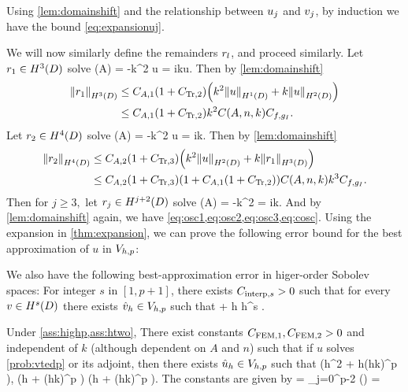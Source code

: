 Using \cref{lem:domainshift} and the relationship between $u_{j}$ and $v_{j}$, by induction we have the bound \cref{eq:expansionuj}.

We will now similarly define the remainders $r_{l}$, and proceed similarly.
Let $\ro \in \HthD$ solve
\beqs
\grad \cdot \mleft(A\grad \ro\mright) = -k^2 u
\eeqs
\beqs
\dn \ro = iku.
\eeqs
Then by \cref{lem:domainshift}
\begin{align*}
\NHthD{\ro} &\leq \CAo\mleft(1+\CTrt\mright)\mleft(k^2\NHoD{u} + k\NHtD{u}\mright)\\
&\leq \CAo\mleft(1+\CTrt\mright)k^2\CAnk\Cfg.
\end{align*}
Let $\rt \in \HfD$ solve
\beqs
\grad \cdot \mleft(A\grad \rt\mright) = -k^2 u
\eeqs
\beqs
\dn \rt = ik\ro.
\eeqs
Then by \cref{lem:domainshift}
\begin{align*}
\NHfD{\rt} &\leq \CAt\mleft(1+\CTrth\mright)\mleft(k^2\NHtD{u} + k\NHthD{\ro}\mright)\\
&\leq \CAt\mleft(1+\CTrth\mright)\mleft(1 + \CAo\mleft(1+\CTrt\mright)\mright)\CAnk k^3\Cfg.
\end{align*}
Then for $j \geq 3,$ let $\rj \in \HjptD$ solve
\beqs
\grad \cdot \mleft(A\grad \rt\mright) = -k^2 \rjmt
\eeqs
\beqs
\dn \rj = ik\rjmo.
\eeqs
And by \cref{lem:domainshift} again, we have \cref{eq:osc1,eq:osc2,eq:osc3,eq:cosc}.
\epf
Using the expansion in \cref{thm:expansion}, we can prove the following error bound for the best approximation of $u$ in $V_{h,p}$:

We also have the following best-approximation error in higer-order Sobolev spaces:
\label{lem:bestapproxhigh}
For integer $s$ in $[1,p+1]$, there exists $C_{\mathrm{interp},s}>0$ such that for every $v \in \HsD$ there exists $\hat{v}_{h} \in V_{h,p}$ such that
\beqs
{} + h \leq \Cinterps h^s .
\eeqs
\ele

\label{lem:bestapprox}
Under \cref{ass:highp,ass:htwo}, There exist constants $C_{\mathrm{FEM},1}, C_{\mathrm{FEM},2} > 0$ and independent of $k$ (although dependent on $A$ and $n$) such that if $u$ solves \cref{prob:vtedp} or its adjoint, then there exists $\hat{u}_{h} \in V_{h,p}$ such that
\beq\label{eq:bestapproxL2}
 \leq \mleft(\CFEMo h^2 + \CFEMt \CAnk h\mleft(hk\mright)^p \mright)\Cfg,
\eeq
\beq\label{eq:bestapproxH1}
 \leq \mleft(\CFEMo h + \CFEMt \CAnk \mleft(hk\mright)^p \mright)\Cfg \tand
\eeq
\beq\label{eq:bestapproxW}
 \mleft(\CFEMo h + \CFEMt \CAnk \mleft(hk\mright)^p \mright)\Cfg.
\eeq
The constants are given by
\beq\label{eq:CFEMs}
\CFEMo = \sum_{j=0}^{p-2} \Pj\mleft(\mright) \tand \CFEMt = \Cosc
\eeq
\ele

